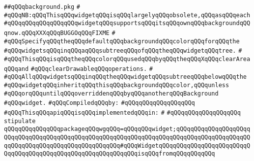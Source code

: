 \label{src/lib/x-kit/widget/old/wrapper/background.api}
\verb|##qQQqbackground.pkg|\newline
\verb|#|\newline
\verb|#qQQqNB:qQQqThisqQQqwidgetqQQqisqQQqlargelyqQQqobsolete,qQQqasqQQqeach|\newline
\verb|#qQQqqQQqqQQqqQQqqQQqwidgetqQQqsupportsqQQqitsqQQqownqQQqbackgroundqQQqnow.qQQqXXXqQQqBUGGOqQQqFIXME|\newline
\verb|#|\newline
\verb|#qQQqSpecifyqQQqtheqQQqdefaultqQQqbackgroundqQQqcolorqQQqforqQQqthe|\newline
\verb|#qQQqwidgetsqQQqinqQQqaqQQqsubtreeqQQqofqQQqtheqQQqwidgetqQQqtree.|\newline
\verb|#|\newline
\verb|#qQQqThisqQQqisqQQqtheqQQqcolorqQQqusedqQQqbyqQQqtheqQQqXqQQqclearAreaqQQqand|\newline
\verb|#qQQqclearDrawableqQQqoperations.|\newline
\verb|#|\newline
\verb|#qQQqAllqQQqwidgetsqQQqinqQQqtheqQQqwidgetqQQqsubtreeqQQqbelowqQQqthe|\newline
\verb|#qQQqwidgetqQQqinheritqQQqthisqQQqbackgroundqQQqcolor,qQQqunless|\newline
\verb|#qQQqorqQQquntilqQQqoverriddenqQQqbyqQQqanotherqQQqBackground|\newline
\verb|#qQQqwidget.|\newline
\newline
\verb|#qQQqCompiledqQQqby:|\newline
\verb|#qQQqqQQqqQQqqQQqqQQq|\newline
\newline
\newline
\verb|#qQQqThisqQQqapiqQQqisqQQqimplementedqQQqin:|\newline
\verb|#|\newline
\verb|#qQQqqQQqqQQqqQQqqQQq|\newline
\newline
\verb|stipulate|\newline
\verb|qQQqqQQqqQQqqQQqpackageqQQqwgqQQq=qQQqqQQqwidget;qQQqqQQqqQQqqQQqqQQqqQQqqQQqqQQqqQQqqQQqqQQqqQQqqQQqqQQqqQQqqQQqqQQqqQQqqQQqqQQqqQQqqQQqqQQqqQQqqQQqqQQqqQQqqQQqqQQqqQQqqQQq#qQQqWidgetqQQqqQQqqQQqqQQqqQQqqQQqqQQqqQQqqQQqqQQqqQQqqQQqqQQqqQQqqQQqqQQqisqQQqfromqQQqqQQqqQQq|\newline

